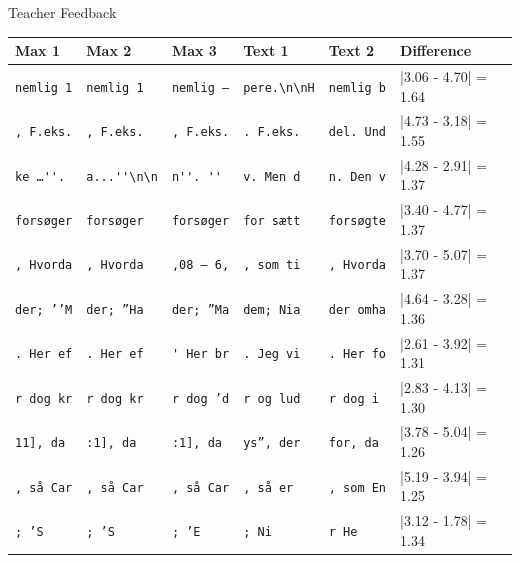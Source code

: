 \documentclass[10pt]{beamer}
\begin{document}
\begin{frame}[fragile]{Teacher Feedback}
    \begin{center}
        \scriptsize
        \begin{tabular}{lll|lll}
            \textbf{Max 1}    & \textbf{Max 2}    & \textbf{Max 3}       &
            \textbf{Text 1}   & \textbf{Text 2}   & \textbf{Difference}  \\
            \hline
            \verb[nemlig 1[   & \verb[nemlig 1[   & \verb[nemlig –[      &
            \verb'pere.\n\nH' & \verb'nemlig b'   & |3.06 - 4.70| = 1.64 \\

            \verb[, F.eks.[   & \verb[, F.eks.[   & \verb[, F.eks.[      &
            \verb'. F.eks.'   & \verb'del. Und'   & |4.73 - 3.18| = 1.55 \\

            \verb[ke …''. [   & \verb[a...''\n\n[ & \verb[n''. '' [      &
            \verb'v. Men d'   & \verb'n. Den v'   & |4.28 - 2.91| = 1.37 \\

            \verb[forsøger[   & \verb[forsøger[   & \verb[forsøger[      &
            \verb'for sætt'   & \verb'forsøgte'   & |3.40 - 4.77| = 1.37 \\

            \verb[, Hvorda[   & \verb[, Hvorda[   & \verb[,08 – 6,[      &
            \verb', som ti'   & \verb', Hvorda'   & |3.70 - 5.07| = 1.37 \\

            \verb[der; ’’M[   & \verb[der; ”Ha[   & \verb[der; ”Ma[      &
            \verb'dem; Nia'   & \verb'der omha'   & |4.64 - 3.28| = 1.36 \\

            \verb[. Her ef[   & \verb[. Her ef[   & \verb[' Her br[      &
            \verb'. Jeg vi'   & \verb'. Her fo'   & |2.61 - 3.92| = 1.31 \\

            \verb[r dog kr[   & \verb[r dog kr[   & \verb[r dog ’d[      &
            \verb'r og lud'   & \verb'r dog i '   & |2.83 - 4.13| = 1.30 \\

            \verb[11], da [   & \verb[:1], da [   & \verb[:1], da [      &
            \verb'ys”, der'   & \verb'for, da '   & |3.78 - 5.04| = 1.26 \\

            \verb[, så Car[   & \verb[, så Car[   & \verb[, så Car[      &
            \verb', så er '   & \verb', som En'   & |5.19 - 3.94| = 1.25 \\
            \hline
            \verb[; ’S[       & \verb[; ’S[       & \verb[; ’E[          &
            \verb'; Ni'       & \verb'r He'       & |3.12 - 1.78| = 1.34 \\


\end{tabular}
\end{center}
\end{frame}
\end{document}
